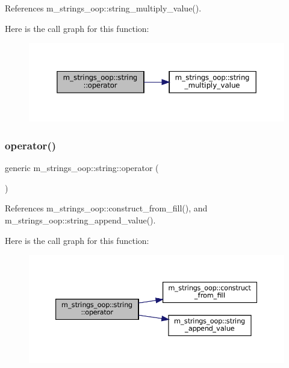 References m\+\_\+strings\+\_\+oop\+::string\+\_\+multiply\+\_\+value().

Here is the call graph for this function\+:\nopagebreak
\begin{figure}[H]
\begin{center}
\leavevmode
\includegraphics[width=350pt]{structm__strings__oop_1_1string_af7cc8956f9ca20d06617dac98ceb15dd_cgraph}
\end{center}
\end{figure}
\mbox{\label{structm__strings__oop_1_1string_a079d7dd91faba60518e61f0634df7a6f}} 
\subsubsection{\texorpdfstring{operator()}{operator()}\hspace{0.1cm}{\footnotesize\ttfamily [10/10]}}
{\footnotesize\ttfamily generic m\+\_\+strings\+\_\+oop\+::string\+::operator (\begin{DoxyParamCaption}{ }\end{DoxyParamCaption})\hspace{0.3cm}{\ttfamily [private]}}



References m\+\_\+strings\+\_\+oop\+::construct\+\_\+from\+\_\+fill(), and m\+\_\+strings\+\_\+oop\+::string\+\_\+append\+\_\+value().

Here is the call graph for this function\+:\nopagebreak
\begin{figure}[H]
\begin{center}
\leavevmode
\includegraphics[width=350pt]{structm__strings__oop_1_1string_a079d7dd91faba60518e61f0634df7a6f_cgraph}
\end{center}
\end{figure}
\mbox{\label{structm__strings__oop_1_1string_ad1eb39ed0e02c1180c933b506d7eaa6a}} 
